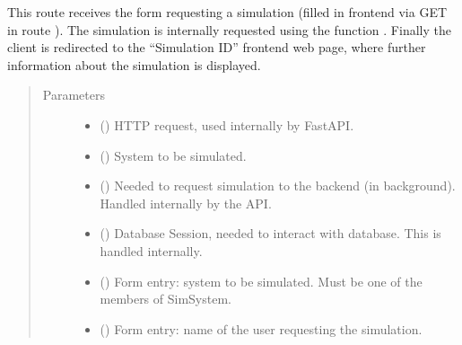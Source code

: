 \documentclass[a4paper,landscape,10pt,english]{sphinxmanual}
\begin{document}
\begin{fulllineitems}
This route receives the form requesting a simulation (filled in
frontend via GET in route ). The simulation is
internally requested using the function
{\hyperref[\detokenize{code_docs/simulation_api.controller:simulation_api.controller.tasks._api_simulation_request}]{}}.
Finally the client is redirected to the “Simulation ID” frontend web
page, where further information about the simulation is displayed.
\begin{quote}\begin{description}
\item[{Parameters}] \leavevmode\begin{itemize}
\item {} 
 () \textendash{} HTTP request, used internally by FastAPI.

\item {} 
 ({\hyperref[\detokenize{code_docs/simulation_api.controller:simulation_api.controller.schemas.SimSystem}]{}}) \textendash{} System to be simulated.

\item {} 
 () \textendash{} Needed to request simulation to the backend (in background). Handled
internally by the API.

\item {} 
 () \textendash{} Database Session, needed to interact with database. This is handled
internally.

\item {} 
 ({\hyperref[\detokenize{code_docs/simulation_api.controller:simulation_api.controller.schemas.SimSystem}]{}}) \textendash{} Form entry: system to be simulated. Must be one of the members of
SimSystem.

\item {} 
 () \textendash{} Form entry: name of the user requesting the simulation.


\end{itemize}
\end{description}
\end{quote}
\end{fulllineitems}
\end{document}

